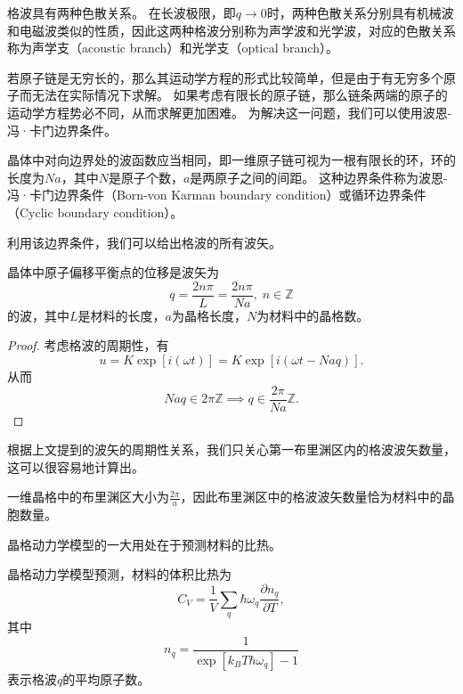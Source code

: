 格波具有两种色散关系。
在长波极限，即$q \to 0$时，两种色散关系分别具有机械波和电磁波类似的性质，因此这两种格波分别称为声学波和光学波，对应的色散关系称为声学支（acoustic branch）和光学支（optical branch）。

若原子链是无穷长的，那么其运动学方程的形式比较简单，但是由于有无穷多个原子而无法在实际情况下求解。
如果考虑有限长的原子链，那么链条两端的原子的运动学方程势必不同，从而求解更加困难。
为解决这一问题，我们可以使用波恩-冯·卡门边界条件。

\begin{proposition}
    晶体中对向边界处的波函数应当相同，即一维原子链可视为一根有限长的环，环的长度为$Na$，其中$N$是原子个数，$a$是两原子之间的间距。
    这种边界条件称为波恩-冯·卡门边界条件（Born-von Karman boundary condition）或循环边界条件（Cyclic boundary condition）。
\end{proposition}
利用该边界条件，我们可以给出格波的所有波矢。
\begin{proposition}
    晶体中原子偏移平衡点的位移是波矢为
    \begin{equation}q = \frac{2n\pi}{L} = \frac{2n\pi}{Na}, \; n \in \mathbb Z\end{equation}
    的波，其中$L$是材料的长度，$a$为晶格长度，$N$为材料中的晶格数。
\end{proposition}

\begin{proof}
    考虑格波的周期性，有
    \begin{equation}
        u = K \exp[i(\omega t)] = K \exp[i(\omega t - N a q)].
    \end{equation}
    从而
    \begin{equation}
        N a q \in 2 \pi \mathbb Z \implies q \in \frac{2\pi}{Na} \mathbb Z.
    \end{equation}
\end{proof}

根据上文提到的波矢的周期性关系，我们只关心第一布里渊区内的格波波矢数量，这可以很容易地计算出。
\begin{corollary}
    一维晶格中的布里渊区大小为$\frac{2\pi}{a}$，因此布里渊区中的格波波矢数量恰为材料中的晶胞数量。
\end{corollary}

晶格动力学模型的一大用处在于预测材料的比热。
\begin{proposition}
    晶格动力学模型预测，材料的体积比热为
    \begin{equation}
        C_V = \frac{1}{V} \sum_q \hbar \omega_q \frac{\partial n_q}{\partial T},
    \end{equation}
    其中
    \begin{equation}
        n_q = \frac{1}{\exp[k_B T \hbar \omega_q ] - 1}
    \end{equation}
    表示格波$q$的平均原子数。
\end{proposition}

